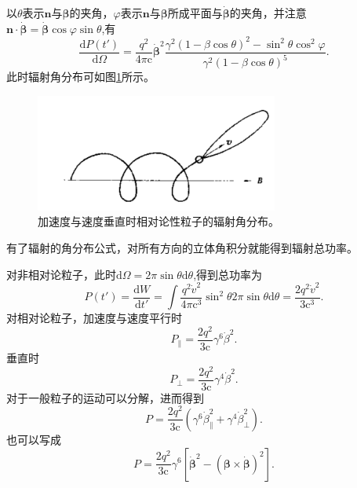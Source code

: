 \documentclass[../天体物理基础.tex]{subfiles}
\begin{document}
以$\theta$表示$\boldsymbol{n}$与$\boldsymbol{\beta}$的夹角，$\varphi$表示$\boldsymbol{n}$与$\boldsymbol{\beta}$所成平面与$\dot{\boldsymbol{\beta}}$的夹角，并注意$\boldsymbol{n}\cdot\dot{\boldsymbol{\beta}}=\dot{\boldsymbol{\beta}}\cos\varphi\sin\theta$,有
\begin{equation}
\frac{\mathrm{d}P\left(t'\right)}{\mathrm{d}\Omega}=\frac{q^{2}}{4\pi\mathrm{c}}\dot{\boldsymbol{\beta}}^{2}\frac{\gamma^{2}\left(1-\beta\cos\theta\right)^{2}-\sin^{2}\theta\cos^{2}\varphi}{\gamma^{2}\left(1-\beta\cos\theta\right)^{5}}.
\end{equation}
此时辐射角分布可如图\ref{加速度与速度垂直时相对论性粒子的辐射角分布。}所示。
\begin{figure}[!htbp]
\centering
\includegraphics[width=8cm]{figures/figure1_7.png}
\captionsetup{justification=raggedright, singlelinecheck=false}
\caption{加速度与速度垂直时相对论性粒子的辐射角分布。}
\label{加速度与速度垂直时相对论性粒子的辐射角分布。}
\end{figure}

有了辐射的角分布公式，对所有方向的立体角积分就能得到辐射总功率。

对非相对论粒子，此时$\mathrm{d}\Omega=2\pi\sin\theta\mathrm{d}\theta$,得到总功率为
\begin{equation}
P\left(t'\right)=\frac{\mathrm{d}W}{\mathrm{d}t'}=\int\frac{q^{2}\dot{v}^{2}}{4\pi \mathrm{c}^{3}}\sin^{2}\theta2\pi\sin\theta\mathrm{d}\theta=\frac{2q^{2}\dot{v}^{2}}{3\mathrm{c}^{3}}.
\end{equation}
对相对论粒子，加速度与速度平行时
\begin{equation}
P_{\parallel}=\frac{2q^{2}}{3\mathrm{c}}\gamma^{6}\dot{\beta}^{2}.
\end{equation}
垂直时
\begin{equation}
P_{\bot}=\frac{2q^{2}}{3\mathrm{c}}\gamma^{4}\dot{\beta}^{2}.
\end{equation}
对于一般粒子的运动可以分解，进而得到
\begin{equation}
P=\frac{2q^{2}}{3\mathrm{c}}\left(\gamma^{6}\dot{\beta}_{\parallel}^{2}+\gamma^{4}\dot{\beta}_{\bot}^{2}\right).
\end{equation}
也可以写成
\begin{equation}
P=\frac{2q^{2}}{3\mathrm{c}}\gamma^{6}\left[\dot{\boldsymbol{\beta}}^{2}-\left(\boldsymbol{\beta}\times\dot{\boldsymbol{\beta}}\right)^{2}\right].\label{1.3.59}
\end{equation}
\end{document}
